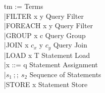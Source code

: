 \documentclass{article}
\begin{document}
\begin{frame}{}
\centering
	\begin{flushright}
	tm := \hfill \quad Terms \hfill \\
	\quad |FILTER \:x \:y \hfill Query Filter\hfill \\
   	\quad |FOREACH \:x \:y \hfill Query Filter \hfill \\
	\quad |GROUP \:x \:c \hfill Query Group\hfill \\
	\quad |JOIN \:x  \:$c_x$ \:y \:$c_y$ \hfill Query Join\hfill \\
	\quad |LOAD \:x \:T \hfill Statement Load\hfill \\
   	\quad |x ::= \:q \hfill Statement Assignment \hfill \\
   	\quad |$s_1 \:;; \:s_2$ \hfill Sequence of Statements \hfill \\
   	\quad |STORE \:x \hfill Statement Store \hfill \\
	\end{flushright}
\end{frame}
\end{document}

